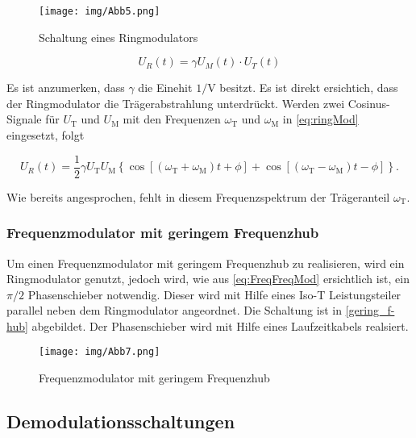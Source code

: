 \begin{figure}
	\centering
	\texttt{[image: img/Abb5.png]}
	\caption{Schaltung eines Ringmodulators \cite{FP}}
	\label{abb:ringMod}
\end{figure}

\begin{equation}
U_R(t) = \gamma U_M(t) \cdot U_T(t)
\label{eq:ringMod}
\end{equation}

\noindent Es ist anzumerken, dass $\gamma$ die Einehit $1 / \text{V}$ besitzt. Es ist direkt ersichtich, dass der Ringmodulator die Trägerabstrahlung unterdrückt. Werden zwei Cosinus-Signale für $U_\text{T}$ und $U_\text{M}$ mit den Frequenzen $\omega_\text{T}$ und $\omega_\text{M}$ in \ref{eq:ringMod} eingesetzt, folgt

\begin{equation}
U_R(t) = \frac{1}{2} \gamma U_\text{T} U_\text{M}  \left\{ \cos\left[(\omega_\text{T} + \omega_\text{M})t + \phi\right] + \cos\left[(\omega_\text{T} - \omega_\text{M})t - \phi \right] \right\}.
\end{equation}

\noindent Wie bereits angesprochen, fehlt in diesem Frequenzspektrum der Trägeranteil $\omega_\text{T}$.

\FloatBarrier

\subsubsection{Frequenzmodulator mit geringem Frequenzhub}
Um einen Frequenzmodulator mit geringem Frequenzhub zu realisieren, wird ein Ringmodulator genutzt, jedoch wird, wie aus \autoref{eq:FreqFreqMod} ersichtlich ist, ein $\pi/2$ Phasenschieber notwendig. Dieser wird mit Hilfe eines Iso-T Leistungsteiler parallel neben dem Ringmodulator angeordnet. Die Schaltung ist in \autoref{gering_f-hub} abgebildet. Der Phasenschieber wird mit Hilfe eines Laufzeitkabels realsiert.

\begin{figure}
	\centering
	\texttt{[image: img/Abb7.png]}
	\caption{Frequenzmodulator mit geringem Frequenzhub \cite{FP}}
	\label{gering_f-hub}
\end{figure}

\FloatBarrier

\subsection{Demodulationsschaltungen}
